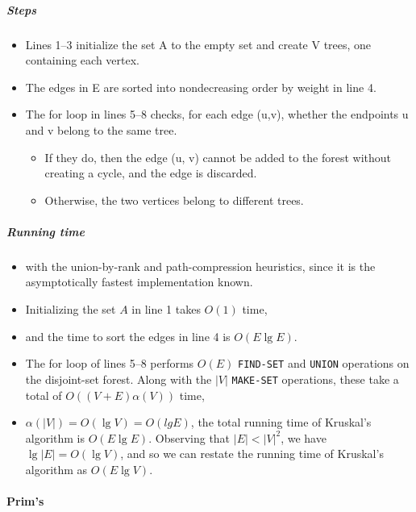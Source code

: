 \documentclass[a4paper,11pt]{article}
\begin{document}
\subparagraph{Steps}\label{steps}

\begin{itemize}
\itemsep1pt\parskip0pt
\item
  Lines 1--3 initialize the set A to the empty set and create
  \textbar{}V \textbar{} trees, one containing each vertex.
\item
  The edges in E are sorted into nondecreasing order by weight in line
  4.
\item
  The for loop in lines 5--8 checks, for each edge (u,v), whether the
  endpoints u and v belong to the same tree.

  \begin{itemize}
  \itemsep1pt\parskip0pt
  \item
    If they do, then the edge (u, v) cannot be added to the forest
    without creating a cycle, and the edge is discarded.
  \item
    Otherwise, the two vertices belong to different trees.
  \end{itemize}
\end{itemize}

\subparagraph{Running time}\label{running-time}

\begin{itemize}
\itemsep1pt\parskip0pt
\item
  with the union-by-rank and path-compression heuristics, since it is
  the asymptotically fastest implementation known.
\item
  Initializing the set $A$ in line 1 takes $O(1)$ time,
\item
  and the time to sort the edges in line 4 is $O(E \lg E)$.
\item
  The for loop of lines 5--8 performs $O(E)$ \texttt{FIND-SET} and
  \texttt{UNION} operations on the disjoint-set forest. Along with the
  $|V|$ \texttt{MAKE-SET} operations, these take a total of
  $O((V + E) \alpha (V))$ time,
\item
  $\alpha (|V|) = O(\lg V) = O(lg E)$, the total running time of
  Kruskal's algorithm is $O(E \lg E)$. Observing that $|E| < |V|^2$, we
  have $\lg |E| = O(\lg V )$, and so we can restate the running time of
  Kruskal's algorithm as $O(E \lg V )$.
\end{itemize}

\paragraph{Prim's}\label{prims}
\end{document}
